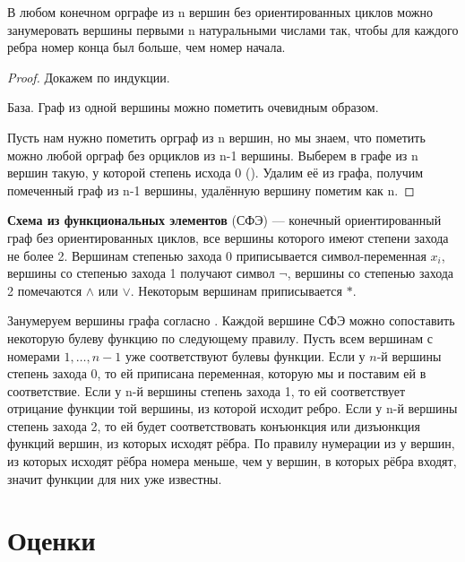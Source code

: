 \begin{theorem}
В любом конечном орграфе из n вершин без ориентированных циклов можно занумеровать вершины
первыми n натуральными числами так, чтобы для каждого ребра номер конца был
больше, чем номер начала.
\end{theorem}
\begin{proof}
Докажем по индукции.

База. Граф из одной вершины можно пометить очевидным образом. 

Пусть нам нужно пометить орграф из n вершин, но мы знаем, что пометить можно любой
орграф без орциклов из n-1 вершины. Выберем в графе из n вершин такую, у которой
степень исхода 0 (). Удалим её из графа, получим
помеченный граф из n-1 вершины, удалённую вершину пометим как n.
\end{proof}
\begin{definition}
	\textbf{Схема из функциональных элементов} (СФЭ) --- конечный
	ориентированный граф без ориентированных циклов, все вершины которого
	имеют степени захода не более 2. Вершинам
	степенью захода 0 приписывается символ-переменная $x_i$, вершины со
	степенью захода 1 получают символ $\neg$, вершины со степенью захода 2
	помечаются $\land$ или $\lor$. Некоторым вершинам приписывается $*$.

	Занумеруем вершины графа согласно . Каждой
	вершине СФЭ можно сопоставить некоторую булеву функцию по следующему
	правилу. Пусть всем вершинам с номерами $1,\ldots, n-1$ уже
	соответствуют булевы функции. Если у $n$-й вершины степень захода 0, то
	ей приписана переменная, которую мы и поставим ей в соответствие. Если у
	n-й вершины степень захода 1, то
	ей соответствует отрицание функции той вершины, из которой исходит ребро.
	Если у n-й вершины степень захода 2, то ей будет соответствовать
	конъюнкция или дизъюнкция функций вершин, из которых исходят рёбра. По
	правилу нумерации из  у вершин, из которых
	исходят рёбра номера меньше, чем у вершин, в которых рёбра входят,
	значит функции для них уже известны.
\end{definition}

\section{Оценки}

